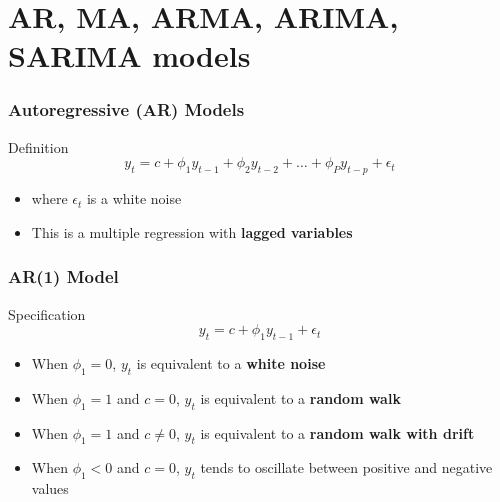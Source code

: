 \documentclass{beamer}
\begin{document}
\section{AR, MA, ARMA, ARIMA, SARIMA models}
\begin{frame}
  \frametitle{Autoregressive (AR) Models}

  \begin{block}{Definition}
    \begin{equation*}
      y_t = c + \phi_1 y_{t-1} + \phi_2 y_{t-2} + \dots + \phi_P y_{t-p} + \epsilon_t
    \end{equation*}

    \begin{itemize}
    \item where $\epsilon_t$ is a white noise
    \item This is a multiple regression with \textbf{lagged variables}
    \end{itemize}    
  \end{block}
\medskip\medskip
\end{frame}


\begin{frame}
  \frametitle{AR(1) Model}
  \begin{block}{Specification}
    \begin{equation*}
      y_t = c + \phi_1 y_{t-1} + \epsilon_t
    \end{equation*}
  \end{block}

  \begin{itemize}
  \item When $\phi_1=0$, $y_t$ is equivalent to a \textbf{white noise}
  \item When $\phi_1=1$ and $c=0$, $y_t$ is equivalent to a \textbf{random walk}
  \item When $\phi_1=1$ and $c \neq 0$, $y_t$ is equivalent to a \textbf{random walk with drift}
  \item When $\phi_1<0$ and $c=0$, $y_t$ tends to oscillate between positive and negative values 
  \end{itemize}
  
\end{frame}
\end{document}
